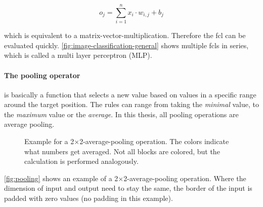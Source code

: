 \begin{equation}
    \label{eq:fcl} 
    o_j = \sum\limits_{i=1}^{n} x_i\cdot w_{i, j} + b_j
\end{equation}

which is equivalent to a matrix-vector-multiplication. Therefore the fcl can be evaluated quickly.
\autoref{fig:image-classification-general} shows multiple fcls in series, which is called a multi layer perceptron (MLP). 

\paragraph{The pooling operator} is basically a function that selects a new value based on values in a specific range around the target position.
The rules can range from taking the \emph{minimal} value, to the \emph{maximum} value or the \emph{average}.
In this thesis, all pooling operations are average pooling.

\begin{figure}[htbp]
    \centering
    \vspace{-0.2cm}
    \caption{
        Example for a 2$\times$2-average-pooling operation. The colors indicate what numbers get averaged. 
        Not all blocks are colored, but the calculation is performed analogously.
    }
    \label{fig:pooling}
\end{figure}

\autoref{fig:pooling} shows an example of a 2$\times$2-average-pooling operation.
Where the dimension of input and output need to stay the same, the border of the input is padded with zero values (no padding in this example).